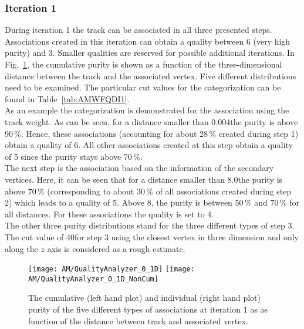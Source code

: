 

\subsubsection{Iteration 1}
During iteration 1 the track can be associated in all three presented steps. Associations created in this iteration can obtain a quality between 6 (very high purity) and 3. Smaller qualities are reserved for possible additional iterations. In Fig.~\ref{plot:AMWFQualityI1}, the cumulative purity is shown as a function of the three-dimensional distance between the track and the associated vertex. Five different distributions need to be examined. The particular cut values for the categorization can be found in Table~\ref{tab:AMWFQDI1}. \\
As an example the categorization is demonstrated for the association using the track weight. As can be seen, for a distance smaller than 0.004\cm the purity is above $90\,\%$. Hence, these associations (accounting for about $28\,\%$ created during step 1) obtain a quality of 6. All other associations created at this step obtain a quality of 5 since the purity stays above $70\,\%$. \\
The next step is the association based on the information of the secondary vertices. Here, it can be seen that for a distance smaller than 8.0\cm the purity is above $70\,\%$ (corresponding to about $30\,\%$ of all associations created during step 2) which leads to a quality of 5. Above 8\cm{}, the purity is between $50\,\%$ and $70\,\%$ for all distances. For these associations the quality is set to 4. \\
The other three purity distributions stand for the three different types of step 3. The cut value of 40\cm for step 3 using the closest vertex in three dimension and only along the $z$ axis is considered as a rough estimate.

\begin{figure}[Ht]
    \centering
    \texttt{[image: AM/QualityAnalyzer\_0\_1D]}
    \texttt{[image: AM/QualityAnalyzer\_0\_1D\_NonCum]}
    \caption[Cumulative and normal purity of iteration 1 \vs{} distance to define quality]{The cumulative (left hand plot) and individual (right hand plot) purity of the five different types of associations at iteration 1 as as function of the distance between track and associated vertex.\label{plot:AMWFQualityI1}}
\end{figure}

